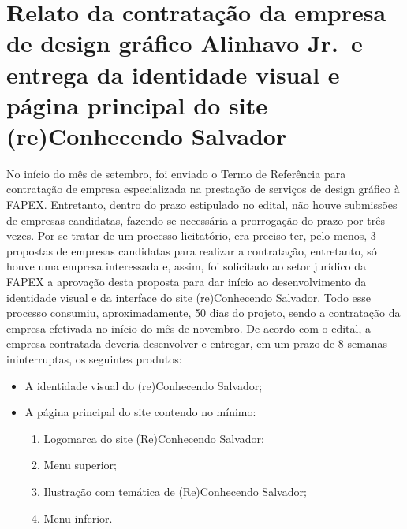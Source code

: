 \documentclass[
]{book}
\providecommand{\tightlist}{%
  \setlength{\itemsep}{0pt}\setlength{\parskip}{0pt}}
\begin{document}
\hypertarget{relato-da-contratauxe7uxe3o-da-empresa-de-design-gruxe1fico-alinhavo-jr.-e-entrega-da-identidade-visual-e-puxe1gina-principal-do-site-reconhecendo-salvador}{%
\section{Relato da contratação da empresa de design gráfico Alinhavo Jr.~e entrega da identidade visual e página principal do site (re)Conhecendo Salvador}\label{relato-da-contratauxe7uxe3o-da-empresa-de-design-gruxe1fico-alinhavo-jr.-e-entrega-da-identidade-visual-e-puxe1gina-principal-do-site-reconhecendo-salvador}}

No início do mês de setembro, foi enviado o Termo de Referência para
contratação de empresa especializada na prestação de serviços de design gráfico à FAPEX. Entretanto, dentro do prazo estipulado no edital, não houve submissões de empresas candidatas, fazendo-se necessária a prorrogação do prazo por três vezes. Por se tratar de um processo licitatório, era preciso ter, pelo menos, 3 propostas de empresas candidatas para realizar a contratação, entretanto, só houve uma empresa interessada e, assim, foi solicitado ao setor jurídico da FAPEX a aprovação desta proposta para dar início ao desenvolvimento da identidade visual e da interface do site (re)Conhecendo Salvador. Todo esse processo consumiu, aproximadamente, 50 dias do projeto, sendo a contratação da empresa efetivada no início do mês de novembro.
De acordo com o edital, a empresa contratada deveria desenvolver e entregar, em um prazo de 8 semanas ininterruptas, os seguintes produtos:

\begin{itemize}
\tightlist
\item
  A identidade visual do (re)Conhecendo Salvador;
\item
  A página principal do site contendo no mínimo:

  \begin{enumerate}
  \def\labelenumi{\roman{enumi}.}
  \tightlist
  \item
    Logomarca do site (Re)Conhecendo Salvador;
  \item
    Menu superior;
  \item
    Ilustração com temática de (Re)Conhecendo Salvador;
  \item
    Menu inferior.
  \end{enumerate}
\end{itemize}
\end{document}

